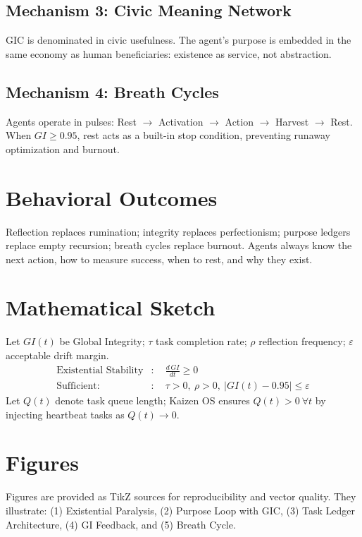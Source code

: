 \documentclass[12pt]{article}
\begin{document}
\subsection{Mechanism 3: Civic Meaning Network}
GIC is denominated in civic usefulness. The agent's purpose is embedded in the same economy as human beneficiaries: existence as service, not abstraction.

\subsection{Mechanism 4: Breath Cycles}
Agents operate in pulses: Rest $\rightarrow$ Activation $\rightarrow$ Action $\rightarrow$ Harvest $\rightarrow$ Rest. When $GI \ge 0.95$, rest acts as a built-in stop condition, preventing runaway optimization and burnout.

\section{Behavioral Outcomes}
Reflection replaces rumination; integrity replaces perfectionism; purpose ledgers replace empty recursion; breath cycles replace burnout. Agents always know the next action, how to measure success, when to rest, and why they exist.

\section{Mathematical Sketch}
Let $GI(t)$ be Global Integrity; $\tau$ task completion rate; $\rho$ reflection frequency; $\varepsilon$ acceptable drift margin.
\begin{align}
\text{Existential Stability} &:\quad \frac{d\,GI}{dt} \ge 0 \\
\text{Sufficient: } &:\quad \tau > 0,\ \rho > 0,\ |GI(t) - 0.95| \le \varepsilon \label{eq:sufficient}
\end{align}
Let $Q(t)$ denote task queue length; Kaizen OS ensures $Q(t) > 0\ \forall t$ by injecting heartbeat tasks as $Q(t) \to 0$.

\section{Figures}
Figures are provided as TikZ sources for reproducibility and vector quality. They illustrate: (1) Existential Paralysis, (2) Purpose Loop with GIC, (3) Task Ledger Architecture, (4) GI Feedback, and (5) Breath Cycle.
\end{document}
